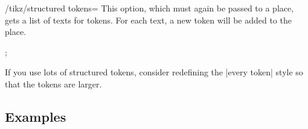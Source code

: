 \begin{key}{/tikz/structured tokens=}
    This option, which must again be passed to a place, gets a list of texts
    for tokens. For each text, a new token will be added to the place.
\begin{codeexample}[preamble={\usetikzlibrary{petri}}]
\tikz  \node[place,structured tokens={$x$,$y$,$z$}] {};
\end{codeexample}
\begin{codeexample}[preamble={\usetikzlibrary{petri}}]
\end{codeexample}
    If you use lots of structured tokens, consider redefining the |every token|
    style so that the tokens are larger.
\end{key}


\subsection{Examples}

